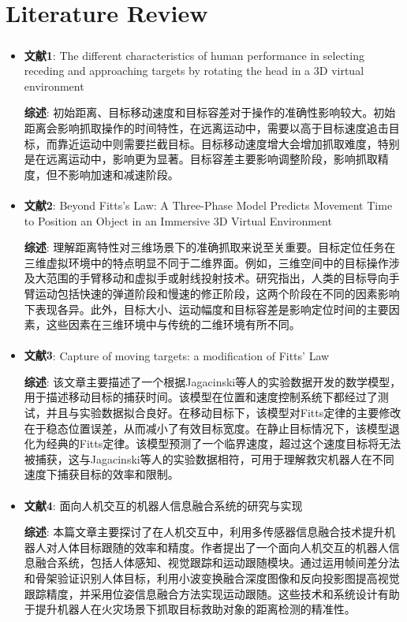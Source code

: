 \documentclass[12pt]{article}  %
\newcommand{\upcite}[1]{\textsuperscript{\textsuperscript{\cite{#1}}}}
\begin{document}
	\section{Literature Review}
	\begin{itemize}[$\blacktriangledown$]
		\setlength{\parsep}{0ex} %
		\setlength{\topsep}{2ex} %
		\setlength{\itemsep}{1ex} %
		\item \textbf{文献1\upcite{1}}: The different characteristics of human performance in selecting receding and approaching targets by rotating the head in a 3D virtual environment
		
		\textbf{综述}: 初始距离、目标移动速度和目标容差对于操作的准确性影响较大。初始距离会影响抓取操作的时间特性，在远离运动中，需要以高于目标速度追击目标，而靠近运动中则需要拦截目标。目标移动速度增大会增加抓取难度，特别是在远离运动中，影响更为显著。目标容差主要影响调整阶段，影响抓取精度，但不影响加速和减速阶段。
		
		\item \textbf{文献2\upcite{2}}: Beyond Fitts’s Law: A Three-Phase Model Predicts Movement Time to Position an Object in an Immersive 3D Virtual Environment
		
		\textbf{综述}: 理解距离特性对三维场景下的准确抓取来说至关重要。目标定位任务在三维虚拟环境中的特点明显不同于二维界面。例如，三维空间中的目标操作涉及大范围的手臂移动和虚拟手或射线投射技术。研究指出，人类的目标导向手臂运动包括快速的弹道阶段和慢速的修正阶段，这两个阶段在不同的因素影响下表现各异。此外，目标大小、运动幅度和目标容差是影响定位时间的主要因素，这些因素在三维环境中与传统的二维环境有所不同。
		
		\item \textbf{文献3\upcite{3}}: Capture of moving targets: a modification of Fitts' Law
		
		\textbf{综述}: 该文章主要描述了一个根据Jagacinski等人的实验数据开发的数学模型，用于描述移动目标的捕获时间。该模型在位置和速度控制系统下都经过了测试，并且与实验数据拟合良好。在移动目标下，该模型对Fitts定律的主要修改在于稳态位置误差，从而减小了有效目标宽度。在静止目标情况下，该模型退化为经典的Fitts定律。该模型预测了一个临界速度，超过这个速度目标将无法被捕获，这与Jagacinski等人的实验数据相符，可用于理解救灾机器人在不同速度下捕获目标的效率和限制。
		
		\item \textbf{文献4\upcite{4}}: 面向人机交互的机器人信息融合系统的研究与实现
		
		\textbf{综述}: 本篇文章主要探讨了在人机交互中，利用多传感器信息融合技术提升机器人对人体目标跟随的效率和精度。作者提出了一个面向人机交互的机器人信息融合系统，包括人体感知、视觉跟踪和运动跟随模块。通过运用帧间差分法和骨架验证识别人体目标，利用小波变换融合深度图像和反向投影图提高视觉跟踪精度，并采用位姿信息融合方法实现运动跟随。这些技术和系统设计有助于提升机器人在火灾场景下抓取目标救助对象的距离检测的精准性。
		

\end{itemize}
\end{document}
